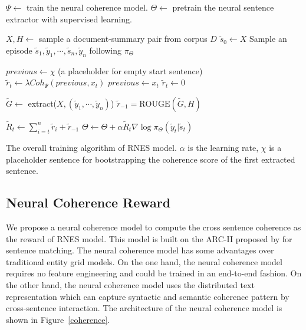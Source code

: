 \documentclass[letterpaper]{article} %
\begin{document}
	\begin{algorithm}[t]
		\small
		\begin{algorithmic}[1]
			\State $\Psi \leftarrow$ train the neural coherence model.
			\State $\Theta \leftarrow$ pretrain the neural sentence extractor with supervised learning.
			
			\Loop
			
			\State $X, H \leftarrow$ sample a document-summary pair from corpus $D$
			\State $\tilde{s}_0 \leftarrow X$
			\State Sample an episode $\tilde{s}_1, \tilde{y}_1, \cdots, \tilde{s}_n, \tilde{y}_n$ following $\pi_{\Theta}$
			
			\State $previous \leftarrow \chi$ (a placeholder for empty start sentence)
			\State $\tilde{r}_t \leftarrow \lambda Coh_{\Psi}(previous, x_t)$
			\State $previous \leftarrow x_t$
			\Else
			\State $\tilde{r}_t \leftarrow 0 $
			\EndIf
			\EndFor
			
			
			\State $\tilde{G} \leftarrow$ extract($X, (\tilde{y}_1, \cdots, \tilde{y}_n)$)
			\State $\tilde{r}_{-1} = \text{ROUGE}(\tilde{G}, H)$
			
			\State $\tilde{R}_t \leftarrow \sum_{i=t}^{n} \tilde{r}_i + \tilde{r}_{-1}$
			\State $\Theta \leftarrow \Theta + \alpha \tilde{R}_t \nabla \log \pi_{\Theta}(\tilde{y}_t|\tilde{s}_t)$
			\EndFor
			
			\EndLoop
			
		\end{algorithmic}
		\caption{The overall training algorithm of RNES model. $\alpha$ is the learning rate, $\chi$ is a placeholder sentence for bootstrapping the coherence score of the first extracted sentence.}
		\label{algo_rnes}
	\end{algorithm}

	\label{RL}
	\subsection{Neural Coherence Reward}
	\label{ncr}
	We propose a neural coherence model to compute the cross sentence coherence as the reward of RNES model. This model is built on the ARC-II proposed by \cite{NIPS2014_hu} for sentence matching. The neural coherence model has some advantages over traditional entity grid models. On the one hand, the neural coherence model requires no feature engineering and could be trained in an end-to-end fashion. On the other hand, the neural coherence model uses the distributed text representation which can capture syntactic and semantic coherence pattern by cross-sentence interaction. The architecture of the neural coherence model is shown in Figure~\ref{coherence}. 
\end{document}
